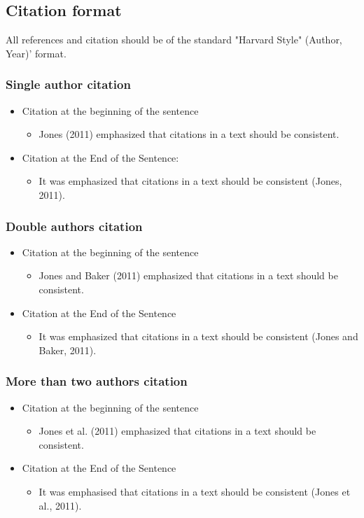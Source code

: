 \subsection {Citation format}
All references and citation should be of the standard "Harvard Style" (Author, Year)’ format.
\subsubsection {Single author citation}
\begin{itemize}
	\item Citation at the beginning of the sentence
	\begin{itemize}
		\item Jones (2011) emphasized that citations in a text should be consistent.
	\end{itemize}
	\item Citation at the End of the Sentence:
	\begin{itemize}
		\item It was emphasized that citations in a text should be consistent (Jones, 2011).
	\end{itemize}	
\end{itemize}

\subsubsection {Double authors citation}
\begin{itemize}
	\item Citation at the beginning of the sentence
	\begin{itemize}
		\item Jones and Baker (2011) emphasized that citations in a text should be consistent.
	\end{itemize}
	\item Citation at the End of the Sentence
	\begin{itemize}
		\item It was emphasized that citations in a text should be consistent (Jones and Baker, 2011).
	\end{itemize}	
\end{itemize}

\subsubsection {More than two authors citation}
\begin{itemize}
	\item Citation at the beginning of the sentence
	\begin{itemize}
		\item Jones et al. (2011) emphasized that citations in a text should be consistent.
	\end{itemize}
	\item Citation at the End of the Sentence
	\begin{itemize}
		\item It was emphasised that citations in a text should be consistent (Jones et al., 2011).
	\end{itemize}	
\end{itemize}


